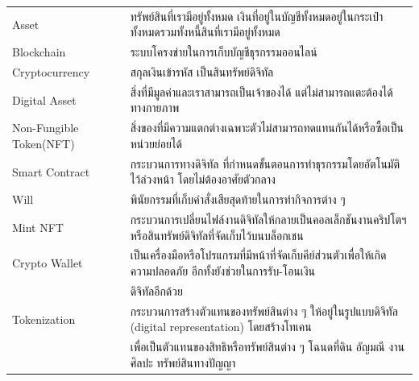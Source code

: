 \documentclass[12pt,oneside,openright,a4paper]{cpe-thai-project}
\begin{document}
%
\listofvocab
\begin{flushleft}
\begin{tabular}{@{}p{1in}@{=\extracolsep{0.5in}}l}
Asset & ทรัพย์สินที่เรามีอยู่ทั้งหมด  เงินที่อยู่ในบัญชีทั้งหมดอยู่ในกระเป๋าทั้งหมดรวมทั้งหนี้สินที่เรามีอยู่ทั้งหมด \\
Blockchain & ระบบโครงข่ายในการเก็บบัญชีธุรกรรมออนไลน์ \\
Cryptocurrency & สกุลเงินเข้ารหัส เป็นสินทรัพย์ดิจิทัล \\
Digital Asset & สิ่งที่มีมูลค่าและเราสามารถเป็นเจ้าของได้ แต่ไม่สามารถแตะต้องได้ทางกายภาพ\\
Non-Fungible Token(NFT) & สิ่งของที่มีความแตกต่างเฉพาะตัวไม่สามารถทดแทนกันได้หรือซื้อเป็นหน่วยย่อยได้\\
Smart Contract & กระบวนการทางดิจิทัล ที่กำหนดขั้นตอนการทำธุรกรรมโดยอัตโนมัติไว้ล่วงหน้า โดยไม่ต้องอาศัยตัวกลาง\\
Will  & พินัยกรรมที่เก็บคำสั่งเสียสุดท้ายในการทำกิจการต่าง ๆ \\
Mint NFT & กระบวนการเปลี่ยนไฟล์งานดิจิทัลให้กลายเป็นคอลเล็กชันงานคริปโตฯ หรือสินทรัพย์ดิจิทัลที่จัดเก็บไว้บนบล็อกเชน \\
Crypto Wallet & เป็นเครื่องมือหรือโปรแกรมที่มีหน้าที่จัดเก็บคีย์ส่วนตัวเพื่อให้เกิดความปลอดภัย อีกทั้งยังช่วยในการรับ-โอนเงิน\\ &ดิจิทัลอีกด้วย \\
Tokenization &  กระบวนการสร้างตัวแทนของทรัพย์สินต่าง ๆ ให้อยู่ในรูปแบบดิจิทัล (digital 
representation) โดยสร้างโทเคน\\ &เพื่อเป็นตัวแทนของสิทธิหรือทรัพย์สินต่าง ๆ โฉนดที่ดิน อัญมณี 
งานศิลปะ ทรัพย์สินทางปัญญา\\
\end{tabular}
\end{flushleft}


\end{document}
